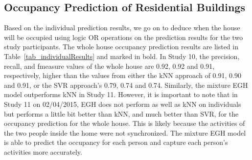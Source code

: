 \subsection{Occupancy Prediction of Residential Buildings}
Based on the individual prediction results, we go on to deduce when the house will be occupied
using logic OR operations on the prediction results for the two study participants. 
The whole house occupancy prediction results are listed in 
Table~\ref{tab_individualResults} and marked in bold. 
In Study 10, the precision, recall, and fmeasure values of the whole house are 0.92, 0.92 and 0.91, respectively,  
higher than the values from either the kNN approach of 0.91, 0.90 and 0.91, or the SVR approach's 0.79, 0.74 and 0.74. 
Similarly, the mixture EGH model outperforms kNN in Study 11. 
However, it is important to note that in Study 11 on 02/04/2015, 
EGH does not perform as well as kNN on individuals
but performs a little bit better than kNN, and much better than SVR, 
for the occupancy prediction for the whole house. 
This is likely because the activities of the two people inside the home 
were not synchronized. The mixture EGH model is able to predict the 
occupancy for each person and capture each person's activities more accurately. 
